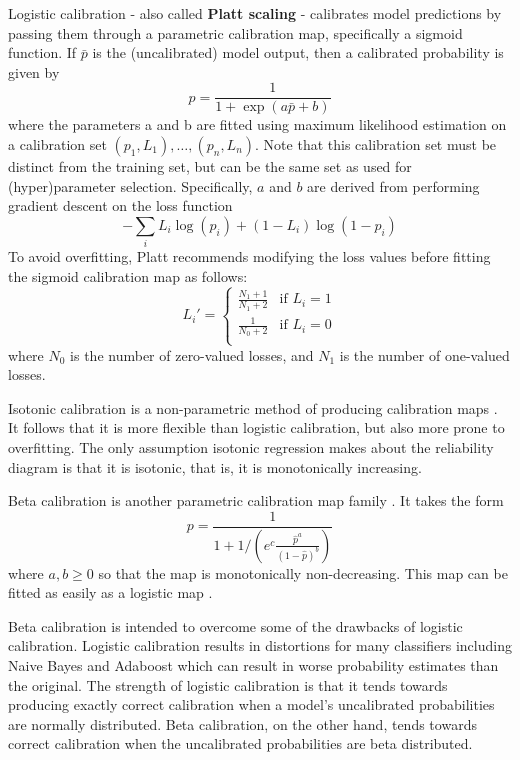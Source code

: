 Logistic calibration - also called {\bf Platt scaling} \cite{platt} - calibrates model predictions by passing them through a parametric calibration map, specifically a sigmoid function. If $\bar{p}$ is the (uncalibrated) model output, then a calibrated probability is given by
\begin{equation}
	p = \frac{1}{1 + \exp(a\bar{p} + b)}
\end{equation}
where the parameters a and b are fitted using maximum likelihood estimation on a calibration set $(p_1,L_1),\dots,(p_n,L_n)$. Note that this calibration set must be distinct from the training set, but can be the same set as used for (hyper)parameter selection. Specifically, $a$ and $b$ are derived from performing gradient descent on the loss function
\begin{equation}
	- \sum_i L_i \log( p_i ) + (1-L_i) \log(1-p_i)
\end{equation}
To avoid overfitting, Platt recommends modifying the loss values before fitting the sigmoid calibration map as follows:
\begin{equation}
	L_i' = \begin{cases}
		\frac{N_1 + 1}{N_1 + 2} & \text{if }L_i=1 \\
		\frac{1}{N_0 + 2} & \text{if }L_i=0 \\
	\end{cases}
\end{equation} 
where $N_0$ is the number of zero-valued losses, and $N_1$ is the number of one-valued losses. 

Isotonic calibration is a non-parametric method of producing calibration maps \cite{isotonic_calibration}. It follows that it is more flexible than logistic calibration, but also more prone to overfitting. The only assumption isotonic regression makes about the reliability diagram is that it is isotonic, that is, it is monotonically increasing. 

Beta calibration is another parametric calibration map family \cite{beyond_sigmoids}. It takes the form
\begin{equation}
	p = \frac{1}{1 + 1/\left(e^c\frac{\hat{p}^a}{(1-\hat{p})^b}\right) }
\end{equation}
where $a,b\ge 0$ so that the map is monotonically non-decreasing. This map can be fitted as easily as a logistic map \cite{beyond_sigmoids}.

Beta calibration is intended to overcome some of the drawbacks of logistic calibration. Logistic calibration results in distortions for many classifiers including Naive Bayes and Adaboost which can result in worse probability estimates than the original. The  strength of logistic calibration is that it tends towards producing exactly correct calibration when a model's uncalibrated probabilities are normally distributed. Beta calibration, on the other hand, tends towards correct calibration when the uncalibrated probabilities are beta distributed.

